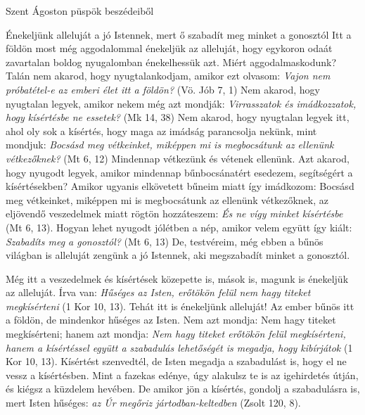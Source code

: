 \documentclass[twoside]{article}
\begin{document}

Szent Ágoston püspök beszédeiből

{\centering{}}

\begin{lectio}{Énekeljünk alleluját a jó Istennek, mert ő szabadít meg minket a gonosztól}
\noindent Itt a földön most még aggodalommal énekeljük az alleluját, hogy egykoron odaát zavartalan boldog nyugalomban énekelhessük azt. Miért aggodalmaskodunk? Talán nem akarod, hogy nyugtalankodjam, amikor ezt olvasom: \textit{Vajon nem próbatétel-e az emberi élet itt a földön?} (Vö. Jób 7, 1) Nem akarod, hogy nyugtalan legyek, amikor nekem még azt mondják: \textit{Virrasszatok és imádkozzatok, hogy kísértésbe ne essetek?} (Mk 14, 38) Nem akarod, hogy nyugtalan legyek itt, ahol oly sok a kísértés, hogy maga az imádság parancsolja nekünk, mint mondjuk: \textit{Bocsásd meg vétkeinket, miképpen mi is megbocsátunk az ellenünk vétkezőknek?} (Mt 6, 12) Mindennap vétkezünk és vétenek ellenünk. Azt akarod, hogy nyugodt legyek, amikor mindennap bűnbocsánatért esedezem, segítségért a kísértésekben? Amikor ugyanis elkövetett bűneim miatt így imádkozom: Bocsásd meg vétkeinket, miképpen mi is megbocsátunk az ellenünk vétkezőknek, az eljövendő veszedelmek miatt rögtön hozzáteszem: \textit{És ne vígy minket kísértésbe} (Mt 6, 13). Hogyan lehet nyugodt jólétben a nép, amikor velem együtt így kiált: \textit{Szabadíts meg a gonosztól?} (Mt 6, 13) De, testvéreim, még ebben a bűnös világban is alleluját zengünk a jó Istennek, aki megszabadít minket a gonosztól.

Még itt a veszedelmek és kísértések közepette is, mások is, magunk is énekeljük az alleluját. Írva van: \textit{Hűséges az Isten, erőtökön felül nem hagy titeket megkísérteni} (1 Kor 10, 13). Tehát itt is énekeljünk alleluját! Az ember bűnös itt a földön, de mindenkor hűséges az Isten. Nem azt mondja: Nem hagy titeket megkísérteni; hanem azt mondja: \textit{Nem hagy titeket erőtökön felül megkísérteni, hanem a kísértéssel együtt a szabadulás lehetőségét is megadja, hogy kibírjátok} (1 Kor 10, 13). Kísértést szenvedtél, de Isten megadja a szabadulást is, hogy el ne vessz a kísértésben. Mint a fazekas edénye, úgy alakulsz te is az igehirdetés útján, és kiégsz a küzdelem hevében. De amikor jön a kísértés, gondolj a szabadulásra is, mert Isten hűséges: \textit{az Úr megőriz jártodban-keltedben} (Zsolt 120, 8).


\end{lectio}
\end{document}
